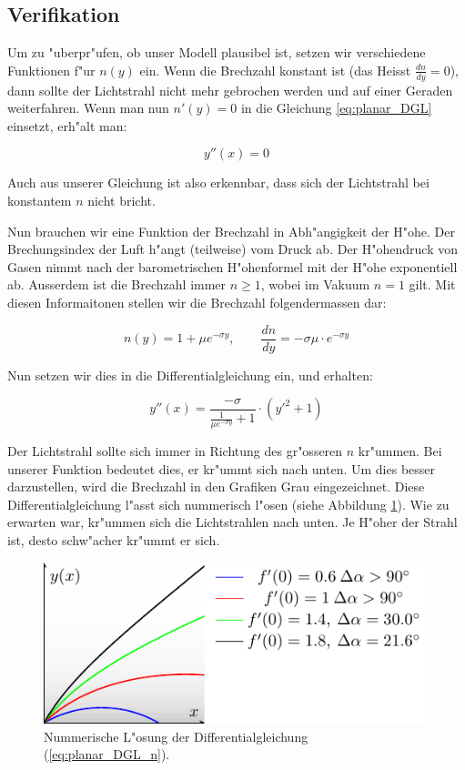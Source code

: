 \begin{refsection}
\subsection{Verifikation}
Um zu "uberpr"ufen, ob unser Modell plausibel ist, setzen wir verschiedene Funktionen f"ur $n(y)$ ein. 
Wenn die Brechzahl konstant ist (das Heisst $\frac{dn}{dy} = 0$), dann sollte der Lichtstrahl nicht mehr gebrochen werden und auf einer Geraden weiterfahren. 
Wenn man nun $n'(y)=0$ in die Gleichung \ref{eq:planar_DGL} einsetzt, erh"alt man: 

$$y''(x) = 0$$

Auch aus unserer Gleichung ist also erkennbar, dass sich der Lichtstrahl bei konstantem $n$ nicht bricht.

Nun brauchen wir eine Funktion der Brechzahl in Abh"angigkeit der H"ohe. 
Der Brechungsindex der Luft h"angt (teilweise) vom Druck ab. 
Der H"ohendruck von Gasen nimmt nach der barometrischen H"ohenformel mit der H"ohe exponentiell ab.
Ausserdem ist die Brechzahl immer $n \geq 1$, wobei im Vakuum $n=1$ gilt. 
Mit diesen Informaitonen stellen wir die Brechzahl folgendermassen dar:

$$n(y) = 1 + \mu e^{- \sigma y}, \qquad \frac{dn}{dy} = -\sigma \mu \cdot e^{-\sigma y}$$

Nun setzen wir dies in die Differentialgleichung ein, und erhalten:

\begin{equation} \label{eq:planar_DGL_n}
y''(x) = \frac{-\sigma}{\frac{1}{\mu e^{-\sigma y}} + 1} \cdot \left( y'^2 + 1 \right)
\end{equation}

Der Lichtstrahl sollte sich immer in Richtung des gr"osseren $n$ kr"ummen. 
Bei unserer Funktion bedeutet dies, er kr"ummt sich nach unten. 
Um dies besser darzustellen, wird die Brechzahl in den Grafiken Grau eingezeichnet.
Diese Differentialgleichung l"asst sich nummerisch l"osen (siehe Abbildung \ref{fig:planares_modell1}).
Wie zu erwarten war, kr"ummen sich die Lichtstrahlen nach unten.
Je H"oher der Strahl ist, desto schw"acher kr"ummt er sich. 

\begin{figure}
  \centering
  \includegraphics{licht/standalone/fig_planar_simulation.pdf}
  \caption{Nummerische L"osung der Differentialgleichung (\ref{eq:planar_DGL_n}). \label{fig:planares_modell1}}


\end{figure}
\end{refsection}
